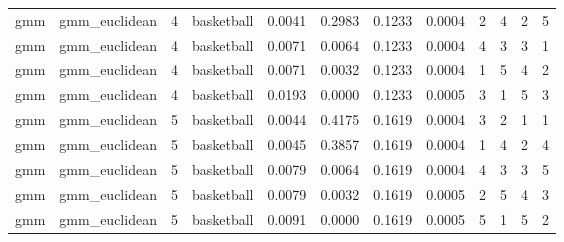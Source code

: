 \documentclass[
]{article}
\begin{document}
\begin{longtable}{| p{1.1cm} | p{2cm} | p{0.8cm} | p{1.3cm} | p{0.60cm} | p{0.7cm} | p{0.65cm} | p{0.65cm} | p{0.65cm} | p{0.65cm} | p{0.7cm} | p{0.65cm} |}
\scriptsize     gmm   & \scriptsize   gmm\_euclidean & \scriptsize    4     & \scriptsize basketball & \scriptsize    0.0041 &   \scriptsize 0.2983 & \scriptsize 0.1233 & \scriptsize    0.0004 &   \scriptsize    2 & \scriptsize    4 &  \scriptsize    2 &  \scriptsize    5 \\
\scriptsize     gmm   & \scriptsize   gmm\_euclidean & \scriptsize    4     & \scriptsize basketball & \scriptsize    0.0071  &  \scriptsize 0.0064 &  \scriptsize 0.1233 & \scriptsize    0.0004 &   \scriptsize    4 &  \scriptsize    3 &  \scriptsize    3 &  \scriptsize    1 \\
\scriptsize     gmm   & \scriptsize   gmm\_euclidean & \scriptsize    4     & \scriptsize basketball & \scriptsize    0.0071   & \scriptsize 0.0032 &  \scriptsize 0.1233 & \scriptsize    0.0004 &   \scriptsize    1 &  \scriptsize    5  & \scriptsize    4  & \scriptsize    2 \\
\scriptsize     gmm   & \scriptsize   gmm\_euclidean & \scriptsize    4     & \scriptsize basketball & \scriptsize    0.0193   & \scriptsize 0.0000 &  \scriptsize 0.1233 & \scriptsize    0.0005 &   \scriptsize    3 &  \scriptsize    1 &  \scriptsize    5 &  \scriptsize    3 \\
\cline{3-12}
\scriptsize     gmm   & \scriptsize   gmm\_euclidean & \scriptsize    5     & \scriptsize basketball & \scriptsize    0.0044   & \scriptsize 0.4175 &  \scriptsize 0.1619 & \scriptsize    0.0004 &   \scriptsize    3 &  \scriptsize    2  & \scriptsize    1  & \scriptsize    1 \\
\scriptsize     gmm   & \scriptsize    gmm\_euclidean & \scriptsize    5    & \scriptsize basketball & \scriptsize    0.0045  &  \scriptsize 0.3857 & \scriptsize 0.1619 & \scriptsize    0.0004 & \scriptsize   1  & \scriptsize    4  & \scriptsize    2  & \scriptsize    4 \\
\scriptsize     gmm   & \scriptsize    gmm\_euclidean & \scriptsize    5    & \scriptsize basketball & \scriptsize    0.0079  &  \scriptsize 0.0064 & \scriptsize 0.1619 & \scriptsize    0.0004 & \scriptsize   4  & \scriptsize    3  & \scriptsize    3  & \scriptsize    5 \\
\scriptsize     gmm   & \scriptsize    gmm\_euclidean & \scriptsize    5    & \scriptsize basketball & \scriptsize    0.0079  &  \scriptsize 0.0032 & \scriptsize 0.1619 & \scriptsize    0.0005 & \scriptsize   2  & \scriptsize    5  & \scriptsize    4  & \scriptsize    3 \\
\scriptsize     gmm   & \scriptsize    gmm\_euclidean & \scriptsize    5    & \scriptsize basketball & \scriptsize    0.0091  &  \scriptsize 0.0000 & \scriptsize 0.1619 & \scriptsize    0.0005 & \scriptsize   5  & \scriptsize    1  & \scriptsize    5  & \scriptsize    2 \\

\end{longtable}
\end{document}

